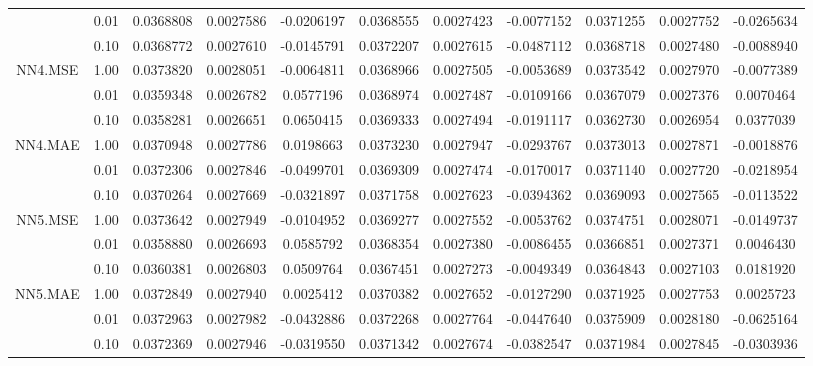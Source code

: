 \begin{longtable}[t]{ccccccccccc}
\cmidrule{1-11}
 & 0.01 & 0.0368808 & 0.0027586 & -0.0206197 & 0.0368555 & 0.0027423 & -0.0077152 & 0.0371255 & 0.0027752 & -0.0265634\\
\cmidrule{2-11}
 & 0.10 & 0.0368772 & 0.0027610 & -0.0145791 & 0.0372207 & 0.0027615 & -0.0487112 & 0.0368718 & 0.0027480 & -0.0088940\\
\cmidrule{2-11}
\multirow{-3}{*}{\centering\arraybackslash NN4.MSE} & 1.00 & 0.0373820 & 0.0028051 & -0.0064811 & 0.0368966 & 0.0027505 & -0.0053689 & 0.0373542 & 0.0027970 & -0.0077389\\
\cmidrule{1-11}
 & 0.01 & 0.0359348 & 0.0026782 & 0.0577196 & 0.0368974 & 0.0027487 & -0.0109166 & 0.0367079 & 0.0027376 & 0.0070464\\
\cmidrule{2-11}
 & 0.10 & 0.0358281 & 0.0026651 & 0.0650415 & 0.0369333 & 0.0027494 & -0.0191117 & 0.0362730 & 0.0026954 & 0.0377039\\
\cmidrule{2-11}
\multirow{-3}{*}{\centering\arraybackslash NN4.MAE} & 1.00 & 0.0370948 & 0.0027786 & 0.0198663 & 0.0373230 & 0.0027947 & -0.0293767 & 0.0373013 & 0.0027871 & -0.0018876\\
\cmidrule{1-11}
 & 0.01 & 0.0372306 & 0.0027846 & -0.0499701 & 0.0369309 & 0.0027474 & -0.0170017 & 0.0371140 & 0.0027720 & -0.0218954\\
\cmidrule{2-11}
 & 0.10 & 0.0370264 & 0.0027669 & -0.0321897 & 0.0371758 & 0.0027623 & -0.0394362 & 0.0369093 & 0.0027565 & -0.0113522\\
\cmidrule{2-11}
\multirow{-3}{*}{\centering\arraybackslash NN5.MSE} & 1.00 & 0.0373642 & 0.0027949 & -0.0104952 & 0.0369277 & 0.0027552 & -0.0053762 & 0.0374751 & 0.0028071 & -0.0149737\\
\cmidrule{1-11}
 & 0.01 & 0.0358880 & 0.0026693 & 0.0585792 & 0.0368354 & 0.0027380 & -0.0086455 & 0.0366851 & 0.0027371 & 0.0046430\\
\cmidrule{2-11}
 & 0.10 & 0.0360381 & 0.0026803 & 0.0509764 & 0.0367451 & 0.0027273 & -0.0049349 & 0.0364843 & 0.0027103 & 0.0181920\\
\cmidrule{2-11}
\multirow{-3}{*}{\centering\arraybackslash NN5.MAE} & 1.00 & 0.0372849 & 0.0027940 & 0.0025412 & 0.0370382 & 0.0027652 & -0.0127290 & 0.0371925 & 0.0027753 & 0.0025723\\
\cmidrule{1-11}
 & 0.01 & 0.0372963 & 0.0027982 & -0.0432886 & 0.0372268 & 0.0027764 & -0.0447640 & 0.0375909 & 0.0028180 & -0.0625164\\
\cmidrule{2-11}
 & 0.10 & 0.0372369 & 0.0027946 & -0.0319550 & 0.0371342 & 0.0027674 & -0.0382547 & 0.0371984 & 0.0027845 & -0.0303936\\

\end{longtable}
